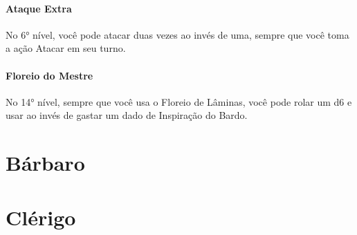 \documentclass{RPG_Adventure}[2021/10/20]
\begin{document}
\begin{multicols}{2}
\subsubsection{Ataque Extra}%

No 6° nível, você pode atacar duas vezes ao invés de uma, sempre que você toma a
ação Atacar em seu turno.

\subsubsection{Floreio do Mestre}%

No 14° nível, sempre que você usa o Floreio de Lâminas, você pode rolar um d6 e
usar ao invés de gastar um dado de Inspiração do Bardo.
\end{multicols}


\chapter{Bárbaro}%
\label{cha:barbaro}
\begin{multicols}{2}
\end{multicols}


\chapter{Clérigo}%
\label{cha:clerigo}
\begin{multicols}{2}
\end{multicols}

\end{document}
